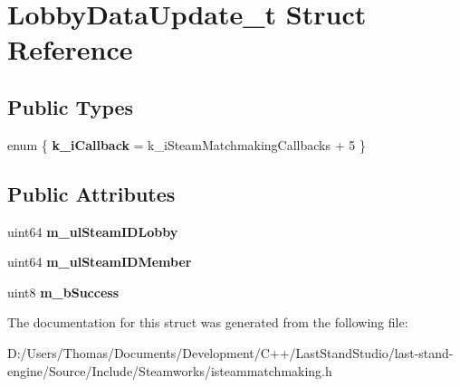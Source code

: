 \hypertarget{structLobbyDataUpdate__t}{}\section{Lobby\+Data\+Update\+\_\+t Struct Reference}
\label{structLobbyDataUpdate__t}
\subsection*{Public Types}
\begin{DoxyCompactItemize}
\item 
\hypertarget{structLobbyDataUpdate__t_a73f736231d6e36dd7e21292cb46b8dc5}{}enum \{ {\bfseries k\+\_\+i\+Callback} = k\+\_\+i\+Steam\+Matchmaking\+Callbacks + 5
 \}\label{structLobbyDataUpdate__t_a73f736231d6e36dd7e21292cb46b8dc5}

\end{DoxyCompactItemize}
\subsection*{Public Attributes}
\begin{DoxyCompactItemize}
\item 
\hypertarget{structLobbyDataUpdate__t_a2764fd8048ccdb64e5cd796da0a45292}{}uint64 {\bfseries m\+\_\+ul\+Steam\+I\+D\+Lobby}\label{structLobbyDataUpdate__t_a2764fd8048ccdb64e5cd796da0a45292}

\item 
\hypertarget{structLobbyDataUpdate__t_aca7589b9afc73335dc35988e26cf0aa8}{}uint64 {\bfseries m\+\_\+ul\+Steam\+I\+D\+Member}\label{structLobbyDataUpdate__t_aca7589b9afc73335dc35988e26cf0aa8}

\item 
\hypertarget{structLobbyDataUpdate__t_ad06bc75f22a6067b7a4c2c0140e9df93}{}uint8 {\bfseries m\+\_\+b\+Success}\label{structLobbyDataUpdate__t_ad06bc75f22a6067b7a4c2c0140e9df93}

\end{DoxyCompactItemize}


The documentation for this struct was generated from the following file\+:\begin{DoxyCompactItemize}
\item 
D\+:/\+Users/\+Thomas/\+Documents/\+Development/\+C++/\+Last\+Stand\+Studio/last-\/stand-\/engine/\+Source/\+Include/\+Steamworks/isteammatchmaking.\+h\end{DoxyCompactItemize}

